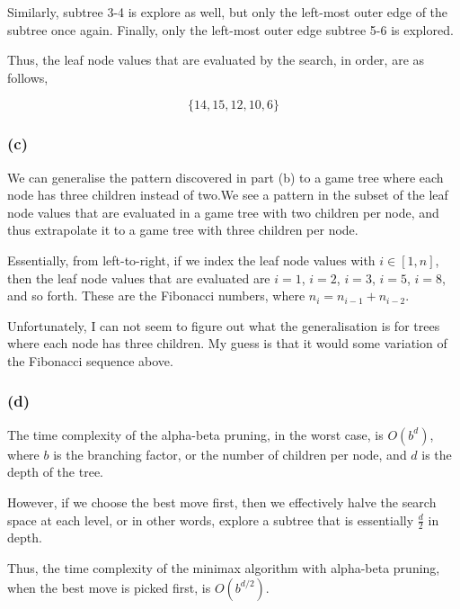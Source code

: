 \documentclass{article}
\begin{document}
Similarly, subtree 3-4 is explore as well, but only the left-most outer edge of the subtree once again. Finally, only the left-most outer edge subtree 5-6 is explored. 

Thus, the leaf node values that are evaluated by the search, in order, are as follows,

$$\{14, 15, 12, 10, 6\}$$

\subsubsection*{(c)}
We can generalise the pattern discovered in part (b) to a game tree where each node has three children instead of two.We see a pattern in the subset of the leaf node values that are evaluated in a game tree with two children per node, and thus extrapolate it to a game tree with three children per node.

Essentially, from left-to-right, if we index the leaf node values with $i \in [1, n]$, then the leaf node values that are evaluated are $i = 1$, $i = 2$, $i = 3$, $i = 5$, $i = 8$, and so forth. These are the Fibonacci numbers, where $n_i = n_{i - 1} + n_{i - 2}$.

Unfortunately, I can not seem to figure out what the generalisation is for trees where each node has three children. My guess is that it would some variation of the Fibonacci sequence above.

\subsubsection*{(d)}
The time complexity of the alpha-beta pruning, in the worst case, is $O(b^d)$, where $b$ is the branching factor, or the number of children per node, and $d$ is the depth of the tree.

However, if we choose the best move first, then we effectively halve the search space at each level, or in other words, explore a subtree that is essentially $\frac{d}{2}$ in depth. 

Thus, the time complexity of the minimax algorithm with alpha-beta pruning, when the best move is picked first, is $O(b^{d/2})$.
\end{document}
